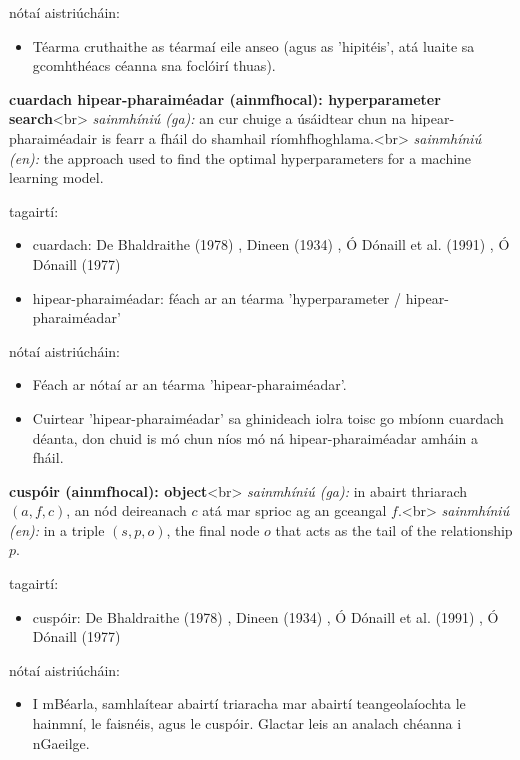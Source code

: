 \documentclass{article}
\begin{document}
nótaí aistriúcháin:
\begin{itemize}
	\item Téarma cruthaithe as téarmaí eile anseo (agus as 'hipitéis', atá luaite sa gcomhthéacs céanna sna foclóirí thuas).
\end{itemize}


\textbf{cuardach hipear-pharaiméadar (ainmfhocal): hyperparameter search}<br>
\textit{sainmhíniú (ga):} an cur chuige a úsáidtear chun na hipear-pharaiméadair is fearr a fháil do shamhail ríomhfhoghlama.<br>
\textit{sainmhíniú (en):} the approach used to find the optimal hyperparameters for a machine learning model.

tagairtí:
\begin{itemize}
	\item cuardach: De Bhaldraithe (1978) \cite{de-bhaldraithe}, Dineen (1934) \cite{dineen}, Ó Dónaill et al. (1991) \cite{focloir-beag}, Ó Dónaill (1977) \cite{odonaill}
	\item hipear-pharaiméadar: féach ar an téarma 'hyperparameter / hipear-pharaiméadar'
\end{itemize}

nótaí aistriúcháin:
\begin{itemize}
	\item Féach ar nótaí ar an téarma 'hipear-pharaiméadar'.
	\item Cuirtear 'hipear-pharaiméadar' sa ghinideach iolra toisc go mbíonn cuardach déanta, don chuid is mó chun níos mó ná hipear-pharaiméadar amháin a fháil.
\end{itemize}


\textbf{cuspóir (ainmfhocal): object}<br>
\textit{sainmhíniú (ga):} in abairt thriarach $(a,f,c)$, an nód deireanach $c$ atá mar sprioc ag an gceangal $f$.<br>
\textit{sainmhíniú (en):} in a triple $(s,p,o)$, the final node $o$ that acts as the tail of the relationship $p$.

tagairtí:
\begin{itemize}
	\item cuspóir: De Bhaldraithe (1978) \cite{de-bhaldraithe}, Dineen (1934) \cite{dineen}, Ó Dónaill et al. (1991) \cite{focloir-beag}, Ó Dónaill (1977) \cite{odonaill}
\end{itemize}

nótaí aistriúcháin:
\begin{itemize}
	\item I mBéarla, samhlaítear abairtí triaracha mar abairtí teangeolaíochta le hainmní, le faisnéis, agus le cuspóir. Glactar leis an analach chéanna i nGaeilge.
\end{itemize}
\end{document}
